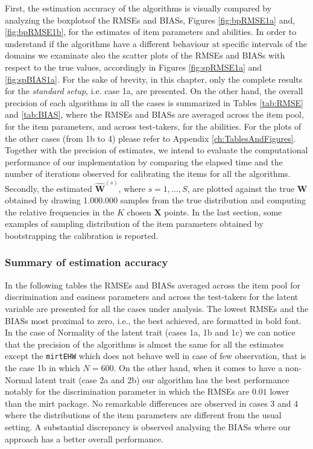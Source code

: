 First, the estimation accuracy of the algorithms is visually compared by analyzing the boxplotsof the RMSEs and BIASs, Figures \ref{fig:bpRMSE1a} and, \ref{fig:bpRMSE1b}, for the estimates of item parameters and abilities. In order to understand if the algorithms have a different behaviour at specific intervals of the domains we examinate also the scatter plots of the RMSEs and BIASs with respect to the true values, accordingly in Figures \ref{fig:spRMSE1a} and \ref{fig:spBIAS1a}. For the sake of brevity, in this chapter, only the complete results for the \emph{standard setup}, i.e. case 1a, are presented. On the other hand, the overall precision of each algorithms in all the cases is summarized in Tables \ref{tab:RMSE} and \ref{tab:BIAS}, where the RMSEs and BIASs are averaged across the item pool, for the item parameters, and across test-takers, for the abilities. For the plots of the other cases (from 1b to 4) please refer to Appendix \ref{ch:TablesAndFigures}.
Together with the precision of estimates, we intend to evaluate the computational performance of our implementation by comparing the elapsed time and the number of iterations observed for calibrating the items for all the algorithms.
Secondly, the estimated $\mathbf{\hat{W}}^{(s)}$, where $s=1,\ldots,S$, are plotted against the true $\mathbf{W}$ obtained by drawing 1.000.000 samples from the true distribution and computing the relative frequencies in the $K$ chosen $\mathbf{X}$ points.
In the last section, some examples of sampling distribution of the item parameters obtained by bootstrapping the calibration is reported. 

\subsubsection{Summary of estimation accuracy}
In the following tables the RMSEs and BIASs averaged across the item pool for discrimination and easiness parameters and across the test-takers for the latent variable are presented for all the cases under analysis. The lowest RMSEs and the BIASs most proximal to zero, i.e., the best achieved, are formatted in bold font. 
In the case of Normality of the latent trait (cases 1a, 1b and 1c) we can notice that the precision of the algorithms is almost the same for all the estimates except the \texttt{mirt\tiny{EHW}} which does not behave well in case of few observation, that is the case 1b in which $N=600$.
On the other hand, when it comes to have a non-Normal latent trait (case 2a and 2b) our algorithm has the best performance notably for the discrimination parameter in which the RMSEs are $0.01$ lower than the mirt package. No remarkable differences are observed in cases 3 and 4 where the distributions of the item parameters are different from the usual setting.
A substantial discrepancy is observed analysing the BIASs where our approach has a better overall performance.

